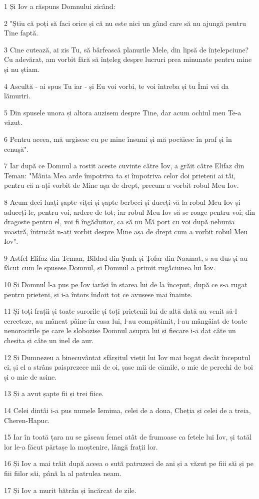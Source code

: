 \par 1 Și Iov a răspuns Domnului zicând:
\par 2 "Știu că poți să faci orice și că nu este nici un gând care să nu ajungă pentru Tine faptă.
\par 3 Cine cutează, ai zis Tu, să bârfească planurile Mele, din lipsă de înțelepciune? Cu adevărat, am vorbit fără să înțeleg despre lucruri prea minunate pentru mine și nu știam.
\par 4 Ascultă - ai spus Tu iar - și Eu voi vorbi, te voi întreba și tu Îmi vei da lămuriri.
\par 5 Din spusele unora și altora auzisem despre Tine, dar acum ochiul meu Te-a văzut.
\par 6 Pentru aceea, mă urgisesc eu pe mine însumi și mă pocăiesc în praf și în cenușă".
\par 7 Iar după ce Domnul a rostit aceste cuvinte către Iov, a grăit către Elifaz din Teman: "Mânia Mea arde împotriva ta și împotriva celor doi prieteni ai tăi, pentru că n-ați vorbit de Mine așa de drept, precum a vorbit robul Meu Iov.
\par 8 Acum deci luați șapte viței și șapte berbeci și duceți-vă la robul Meu Iov și aduceți-le, pentru voi, ardere de tot; iar robul Meu Iov să se roage pentru voi; din dragoste pentru el, voi fi îngăduitor, ca să nu Mă port cu voi după nebunia voastră, întrucât n-ați vorbit despre Mine așa de drept cum a vorbit robul Meu Iov".
\par 9 Astfel Elifaz din Teman, Bildad din Șuah și Țofar din Naamat, s-au dus și au făcut cum le spusese Domnul, și Domnul a primit rugăciunea lui Iov.
\par 10 Și Domnul l-a pus pe Iov iarăși în starea lui de la început, după ce s-a rugat pentru prieteni, și i-a întors îndoit tot ce avusese mai înainte.
\par 11 Și toți frații și toate surorile și toți prietenii lui de altă dată au venit să-l cerceteze, au mâncat pâine în casa lui, l-au compătimit, l-au mângâiat de toate nenorocirile pe care le slobozise Domnul asupra lui și fiecare i-a dat câte un chesita și câte un inel de aur.
\par 12 Și Dumnezeu a binecuvântat sfârșitul vieții lui Iov mai bogat decât începutul ei, și el a strâns paisprezece mii de oi, șase mii de cămile, o mie de perechi de boi și o mie de asine.
\par 13 Și a avut șapte fii și trei fiice.
\par 14 Celei dintâi i-a pus numele Iemima, celei de a doua, Cheția și celei de a treia, Cheren-Hapuc.
\par 15 Iar în toată țara nu se găseau femei atât de frumoase ca fetele lui Iov, și tatăl lor le-a făcut părtașe la moștenire, lângă frații lor.
\par 16 Și Iov a mai trăit după aceea o sută patruzeci de ani și a văzut pe fiii săi și pe fiii fiilor săi, până la al patrulea neam.
\par 17 Și Iov a murit bătrân și încărcat de zile.


